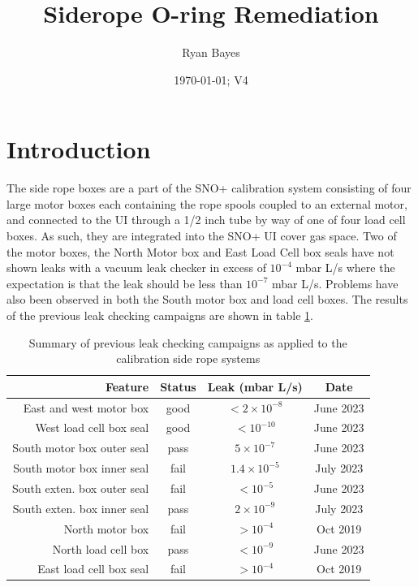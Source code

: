 \documentclass[11pt]{article}
\title{Siderope O-ring Remediation}
\author{Ryan Bayes}
\date{\today; V4}
\begin{document}
\maketitle
\section{Introduction}
The side rope boxes are a part of the SNO+ calibration system  consisting of four large motor boxes each containing the rope spools coupled to an external motor, and connected to the UI through a 1/2 inch tube by way of one of four load cell boxes. As such, they are integrated into the SNO+ UI cover gas space.  Two of the motor boxes, the North Motor box and East Load Cell box seals have not shown leaks with a vacuum leak checker in excess of $10^{-4}$ mbar L/s where the expectation is that the leak should be less than $10^{-7}$ mbar L/s. Problems have also been observed in both the South motor box and load cell boxes. The results of the previous leak checking campaigns are shown in table \ref{tab:leakCheck}.

	\begin{table}
	\caption{Summary of previous leak checking campaigns as applied to the calibration side rope systems}
	\label{tab:leakCheck} 
	\begin{center}
	\begin{tabular}{|r|c|c|c|}
	\hline
	Feature & Status & Leak (mbar L/s)& Date\\\hline
	East and west motor box & good & $< 2\times10^{-8}$ & June 2023 \\
	West load cell box seal & good & $< 10^{-10}$ & June 2023 \\
	South motor box outer seal & pass & $5\times10^{-7}$ & June 2023 \\
	South motor box inner seal & fail &  $1.4\times10^{-5}$ & July 2023 \\
	South exten. box outer seal & fail &  $< 10^{-5}$ & June 2023 \\
	South exten. box inner seal & pass &  $2\times10^{-9}$ & July 2023 \\
	North motor box & fail &  $ > 10^{-4}$ & Oct 2019 \\
	North load cell box & pass&  $ < 10^{-9}$ & June 2023 \\
	East load cell box seal & fail & $ > 10^{-4}$ & Oct 2019 \\
	\hline
	\end{tabular}
	\end{center}
	\end{table}
	
\end{document}
